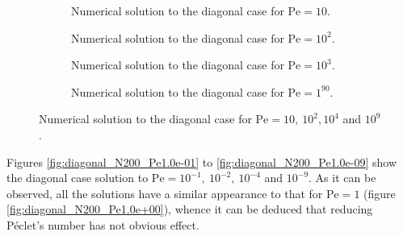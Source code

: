 \begin{figure}[h]
	\centering
	\begin{subfigure}{.5\textwidth}
		\centering
		\vspace{-0.75cm}
		
		\vspace{-0.50cm}
		\captionsetup{width=0.8\textwidth}
		\caption{Numerical solution to the diagonal case for $\mathrm{Pe} = 10$.}
		\label{fig:diagonal_N200_Pe1.0e+01}
	\end{subfigure}%
	\begin{subfigure}{.5\textwidth}
		\centering
		\vspace{-0.75cm}
		
		\vspace{-0.50cm}
		\captionsetup{width=0.8\textwidth}
		\caption{Numerical solution to the diagonal case for $\mathrm{Pe} = 10^2$.}
		\label{fig:diagonal_N200_Pe1.0e+02}
	\end{subfigure}
	\begin{subfigure}{.5\textwidth}
		\centering
		\vspace{-0.25cm}
		
		\vspace{-0.50cm}
		\captionsetup{width=0.8\textwidth}
		\caption{Numerical solution to the diagonal case for $\mathrm{Pe} = 10^3$.}
		\label{fig:diagonal_N200_Pe1.0e+04}
	\end{subfigure}%
	\begin{subfigure}{.5\textwidth}
		\centering
		\vspace{-0.25cm}
		
		\vspace{-0.50cm}
		\captionsetup{width=0.8\textwidth}
		\caption{Numerical solution to the diagonal case for $\mathrm{Pe} = 1^90$.}
		\label{fig:diagonal_N200_Pe1.0e+09}
	\end{subfigure}%
	\caption{Numerical solution to the diagonal case for $\mathrm{Pe} = 10, \ 10^2, 10^4$ and $10^9$.}
	\label{fig:diagonal_N200_Pe_greater_than_1}
\end{figure}

\clearpage
Figures \ref{fig:diagonal_N200_Pe1.0e-01} to \ref{fig:diagonal_N200_Pe1.0e-09} show the diagonal case solution to $\mathrm{Pe} = 10^{-1}, \ 10^{-2}, \ 10^{-4}$ and $10^{-9}$. As it can be observed, all the solutions have a similar appearance to that for $\mathrm{Pe} = 1$ (figure \ref{fig:diagonal_N200_Pe1.0e+00}), whence it can be deduced that reducing Péclet's number has not obvious effect.

